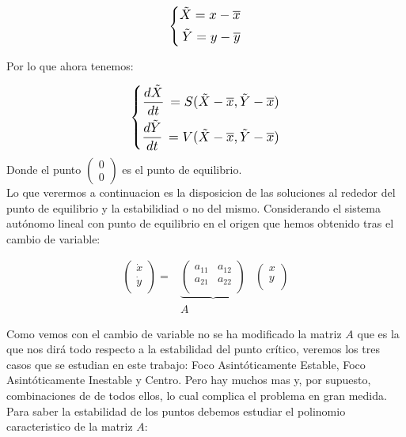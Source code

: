 \documentclass[12pt,a4paper]{report} %
\begin{document}
	\begin{equation}
		\label{eq:trans}
		\scalebox{1.2}{$\displaystyle
			\left\{
			\begin{aligned}
				\tilde{X}=x-\overline{x} \\
				\tilde{Y}=y-\overline{y}
			\end{aligned}
			\right.
			$}
	\end{equation}\smallskip
	
	Por lo que ahora tenemos:
	
	\begin{equation}
		\label{eq:trans2}
		\scalebox{1.2}{$\displaystyle
			\left\{
			\begin{aligned}
				\frac{d\tilde{X}}{dt}\,=S(\tilde{X}-\overline{x},\tilde{Y}-\overline{x}) \\
				\frac{d\tilde{Y}}{dt}\,=V(\tilde{X}-\overline{x},\tilde{Y}-\overline{x})
			\end{aligned}
			\right.
			$}
	\end{equation}\smallskip
	Donde el punto $\begin{pmatrix} 0 \\ 0 \end{pmatrix}$ es el punto de equilibrio. \\[0.5cm]
	Lo que verermos a continuacion es la disposicion de las soluciones al rededor del punto de equilibrio y la estabilidiad o no del mismo. Considerando el sistema autónomo lineal con punto de equilibrio en el origen que hemos obtenido tras el cambio de variable:
	
	\begin{eqnarray}
		\label{eq:trans3}
			\begin{pmatrix}
				\dot{x}\\
				\dot{y}\\
			\end{pmatrix} =
			&\underbrace{\begin{pmatrix}
				a_{11} & a_{12}\\
				a_{21} & a_{22}\\
			\end{pmatrix}}&
			\begin{pmatrix}
				x\\
				y\\
			\end{pmatrix} \nonumber \\[1mm]
			&A&
	\end{eqnarray} \smallskip
	
	Como vemos con el cambio de variable no se ha modificado la matriz $A$ que es la que nos dirá todo respecto a la estabilidad del punto crítico, veremos los tres casos que se estudian en este trabajo: Foco Asintóticamente Estable, Foco Asintóticamente Inestable y Centro. Pero hay muchos mas y, por supuesto, combinaciones de de todos ellos, lo cual complica el problema en gran medida.\\[0.5cm]
	Para saber la estabilidad de los puntos debemos estudiar el polinomio caracteristico de la matriz $A$:
	
\end{document}
